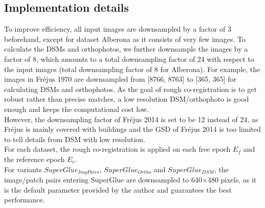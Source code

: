 \subsection{Implementation details}
\label{Implementationdetails}
To improve efficiency, all input images are downsampled by a factor of 3 beforehand, except for dataset Alberona as it consists of very few images. To calculate the DSMs and orthophotos, we further downsample the images by a factor of 8, which amounts to a total downsampling factor of 24 with respect to the input images (total downsampling factor of 8 for Alberona). For example, the images in Fr{\'e}jus 1970 are downsampled from [8766, 8763] to [365, 365] for calculating \ac{DSM}s and orthophotos. As the goal of rough co-registration is to get robust rather than precise matches, a low resolution DSM/orthophoto is good enough and keeps the computational cost low. \\
However, the downsampling factor of Fr{\'e}jus 2014 is set to be 12 instead of 24, as Fr{\'e}jus is mainly covered with buildings and the GSD of Fr{\'e}jus 2014 is too limited to tell details from DSM with low resolution.\\%
For each dataset, the rough co-registration is applied on each free epoch $E_f$ and the reference epoch $E_r$.\\
For variants $SuperGlue_{ImgPairs}$, $SuperGlue_{Ortho}$ and $SuperGlue_{DSM}$, the image/patch pairs entering SuperGlue are downsampled to 640$\times$480 pixels, as it is the default parameter provided by the author and guarantees the best performance. 


